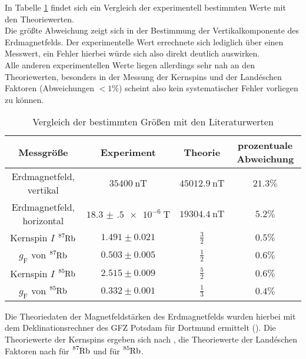 In Tabelle \ref{tab:discuss} findet sich ein Vergleich der experimentell bestimmten Werte mit den Theoriewerten.\\
Die größte Abweichung zeigt sich in der Bestimmung der Vertikalkomponente des Erdmagnetfelds. Der experimentelle Wert errechnete sich lediglich über einen Messwert, ein Fehler hierbei würde sich also direkt deutlich auswirken.\\
Alle anderen experimentellen Werte liegen allerdings sehr nah an den Theoriewerten, besonders in der Messung der Kernspins und der Landéschen Faktoren (Abweichungen $<1\%$) scheint also kein systematischer Fehler vorliegen zu können.\\
\begin{table}
  \caption{Vergleich der bestimmten Größen mit den Literaturwerten}
  \label{tab:discuss}
 \centering
 \begin{tabular}{cccc}
   \toprule
Messgröße&Experiment&Theorie&prozentuale Abweichung\\
\midrule
Erdmagnetfeld, vertikal&$\SI{35400}{\nano\tesla}$&$\SI{45012.9}{\nano\tesla}$&$21.3\%$\\
Erdmagnetfeld, horizontal&$\SI{18.3(5)e-6}{\tesla}$&$\SI{19304.4}{\nano\tesla}$&$5.2\%$\\
Kernspin $I$ $\ce{^87Rb}$&$1.491\pm0.021$&$\frac{3}{2}$&$0.5\%$\\
$g_{\mathrm{F}}$ von $\ce{^87Rb}$&$0.503\pm0.005$&$\frac{1}{2}$&$0.6\%$\\
Kernspin $I$ $\ce{^85Rb}$&$2.515\pm0.009$&$\frac{5}{2}$&$0.6\%$\\
$g_{\mathrm{F}}$ von $\ce{^85Rb}$&$0.332\pm0.001$&$\frac{1}{3}$&$0.4\%$\\
\bottomrule
\end{tabular}
\end{table}
Die Theoriedaten der Magnetfeldstärken des Erdmagnetfelds wurden hierbei mit dem Deklinationsrechner des GFZ Potsdam für Dortmund ermittelt (\cite{dekli}).
Die Theoriewerte der Kernspins ergeben sich nach \cite{muenster}, die Theoriewerte der Landéschen Faktoren nach \cite{gf} für $\ce{^87Rb}$ und \cite{gf2} für $\ce{^85Rb}$.
